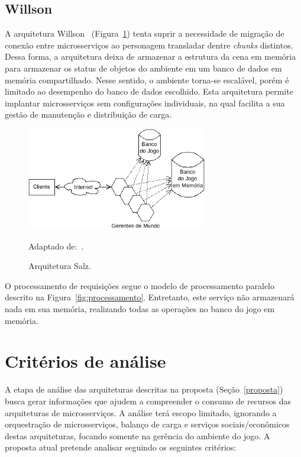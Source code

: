 \subsection{Willson}
\label{willson}

A arquitetura Willson~\cite{stephenclarkewillson2017} (Figura~\ref{fig:willson}) tenta suprir a necessidade de migração de conexão entre microsserviços ao personagem transladar dentre \textit{chunks} distintos.
%
Dessa forma, a arquitetura deixa de armazenar a estrutura da cena em memória para armazenar os status de objetos do ambiente em um banco de dados em memória compartilhado.
%
Nesse sentido, o ambiente torna-se escalável, porém é limitado ao desempenho do banco de dados escolhido.
%
Esta arquitetura permite implantar microsserviços sem configurações individuais, na qual facilita a sua gestão de manutenção e distribuição de carga.

\begin{figure}[htb!]
  \caption{Arquitetura Salz.}
  \label{fig:willson}
  \includegraphics[height=4.5cm]{img/cap3/willson.png}
  \centering

  Adaptado de:~\cite{albion_online_unite}.
\end{figure}

O processamento de requisições segue o modelo de processamento paralelo descrito na Figura~\ref{fig:processamento}.
%
Entretanto, este serviço não armazenará nada em sua memória, realizando todas as operações no banco do jogo em memória.


\section{Critérios de análise}
\label{analise}

A etapa de análise das arquiteturas descritas na proposta (Seção~\ref{proposta}) busca gerar informações que ajudem a compreender o consumo de recursos das arquiteturas de microsserviços.
%
A análise terá escopo limitado, ignorando a orquestração de microsserviços, balanço de carga e serviços sociais/econômicos destas arquiteturas, focando somente na gerência do ambiente do jogo.
%
A proposta atual pretende analisar seguindo os seguintes critérios:

